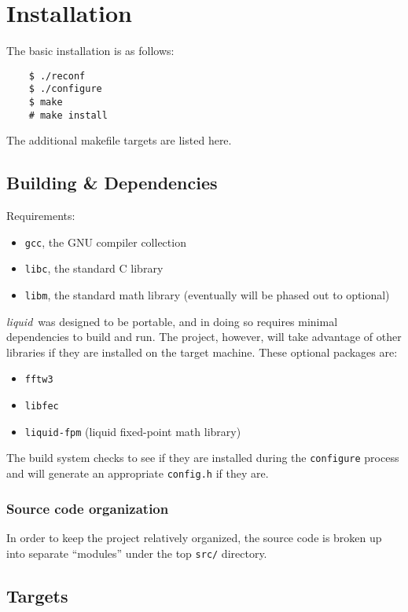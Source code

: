 \documentclass[11pt,twoside]{report}
\newcommand{\liquid}{{\it liquid}}
\begin{document}
%
%
\chapter{Installation}
\label{ch:installation}
The basic installation is as follows:
\begin{verbatim}
    $ ./reconf
    $ ./configure
    $ make
    # make install
\end{verbatim}
The additional makefile targets are listed here.

\section{Building \& Dependencies}
\label{ch:installation:building}
Requirements:
\begin{itemize}
\item {\tt gcc}, the GNU compiler collection
\item {\tt libc}, the standard C library
\item {\tt libm}, the standard math library (eventually will be phased out to
optional)
\end{itemize}

\liquid\ was designed to be portable, and in doing so requires minimal dependencies to
build and run.
The project, however, will take advantage of other libraries if they are installed on the
target machine.
These optional packages are:
\begin{itemize}
\item {\tt fftw3}
\item {\tt libfec}
\item {\tt liquid-fpm} (liquid fixed-point math library)
\end{itemize}
The build system checks to see if they are installed during the {\tt configure} process
and will generate an appropriate {\tt config.h} if they are.

\subsection{Source code organization}
In order to keep the project relatively organized, the source code is broken
up into separate ``modules'' under the top {\tt src/} directory.

\section{Targets}
\label{ch:installation:targets}
\end{document}
